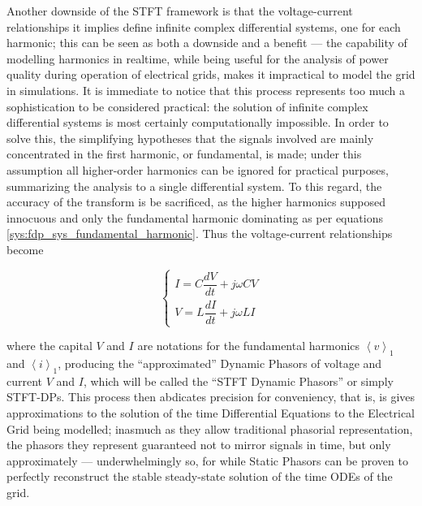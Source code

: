 	Another downside of the STFT framework is that the voltage-current relationships it implies define infinite complex differential systems, one for each harmonic; this can be seen as both a downside and a benefit — the capability of modelling harmonics in realtime, while being useful for the analysis of power quality during operation of electrical grids, makes it impractical to model the grid in simulations. It is immediate to notice that this process represents too much a sophistication to be considered practical: the solution of infinite complex differential systems is most certainly computationally impossible. In order to solve this, the simplifying hypotheses that the signals involved are mainly concentrated in the first harmonic, or fundamental, is made; under this assumption all higher-order harmonics can be ignored for practical purposes, summarizing the analysis to a single differential system. To this regard, the accuracy of the transform is be sacrificed, as the higher harmonics supposed innocuous and only the fundamental harmonic dominating as per equations \eqref{sys:fdp_sys_fundamental_harmonic}. Thus the voltage-current relationships become

\begin{equation} \left\{\begin{array}{l} I = C\dfrac{dV}{dt} + j\omega CV \\[5mm] V = L\dfrac{dI}{dt} + j\omega LI \end{array}\right. \label{sys:fdp_sys_fundamental_harmonic} \end{equation}

	\noindent where the capital $V$ and $I$ are notations for the fundamental harmonics $\left\langle v\right\rangle_1$ and $\left\langle i\right\rangle_1$, producing the ``approximated'' Dynamic Phasors of voltage and current $V$ and $I$, which will be called the ``STFT Dynamic Phasors'' or simply STFT-DPs. This process then abdicates precision for conveniency, that is, is gives approximations to the solution of the time Differential Equations to the Electrical Grid being modelled; inasmuch as they allow traditional phasorial representation, the phasors they represent guaranteed not to mirror signals in time, but only approximately — underwhelmingly so, for while Static Phasors can be proven to perfectly reconstruct the stable steady-state solution of the time ODEs of the grid. 

